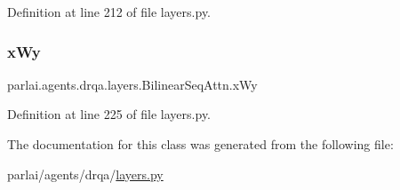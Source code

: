 Definition at line 212 of file layers.\+py.

\mbox{\label{classparlai_1_1agents_1_1drqa_1_1layers_1_1BilinearSeqAttn_a6a14946097618712765aba7243f0c075}} 
\subsubsection{\texorpdfstring{x\+Wy}{xWy}}
{\footnotesize\ttfamily parlai.\+agents.\+drqa.\+layers.\+Bilinear\+Seq\+Attn.\+x\+Wy}



Definition at line 225 of file layers.\+py.



The documentation for this class was generated from the following file\+:\begin{DoxyCompactItemize}
\item 
parlai/agents/drqa/\hyperlink{layers_8py}{layers.\+py}\end{DoxyCompactItemize}
